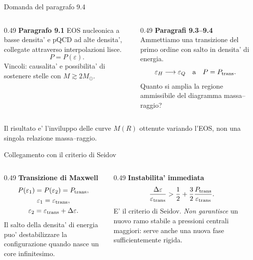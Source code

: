 \begin{frame}{Domanda del paragrafo 9.4}
\small
\begin{columns}[T,onlytextwidth]
\begin{column}{0.49\textwidth}
\textbf{Paragrafo 9.1}
\medskip
EOS nucleonica a basse densita' e pQCD ad alte densita', collegate attraverso interpolazioni lisce.
\[
P=P(\varepsilon).
\]
Vincoli: causalita' e possibilita' di sostenere stelle con $M\gtrsim2M_\odot$.
\end{column}
\begin{column}{0.49\textwidth}
\textbf{Paragrafi 9.3--9.4}
\medskip
Ammettiamo una transizione del primo ordine con salto in densita' di energia.
\[
\varepsilon_H\longrightarrow\varepsilon_Q
\quad\text{a}\quad P=P_{\rm trans}.
\]
Quanto si amplia la regione ammissibile del diagramma massa--raggio?
\end{column}
\end{columns}
\medskip
Il risultato e' l'inviluppo delle curve $M(R)$ ottenute variando l'EOS, non una singola relazione massa--raggio.
\end{frame}

\begin{frame}{Collegamento con il criterio di Seidov}
\small
\begin{columns}[T,onlytextwidth]
\begin{column}{0.49\textwidth}
\textbf{Transizione di Maxwell}
\[
\begin{gathered}
P(\varepsilon_1)=P(\varepsilon_2)=P_{\rm trans},\\
\varepsilon_1=\varepsilon_{\rm trans},\\
\varepsilon_2=\varepsilon_{\rm trans}+\Delta\varepsilon.
\end{gathered}
\]
Il salto della densita' di energia puo' destabilizzare la configurazione quando nasce un core infinitesimo.
\end{column}
\begin{column}{0.49\textwidth}
\textbf{Instabilita' immediata}
\[
\frac{\Delta\varepsilon}{\varepsilon_{\rm trans}}>
\frac12+\frac32\frac{P_{\rm trans}}{\varepsilon_{\rm trans}}.
\]
E' il criterio di Seidov.
\medskip
\textit{Non garantisce} un nuovo ramo stabile a pressioni centrali maggiori: serve anche una nuova fase sufficientemente rigida.
\end{column}
\end{columns}
\end{frame}

